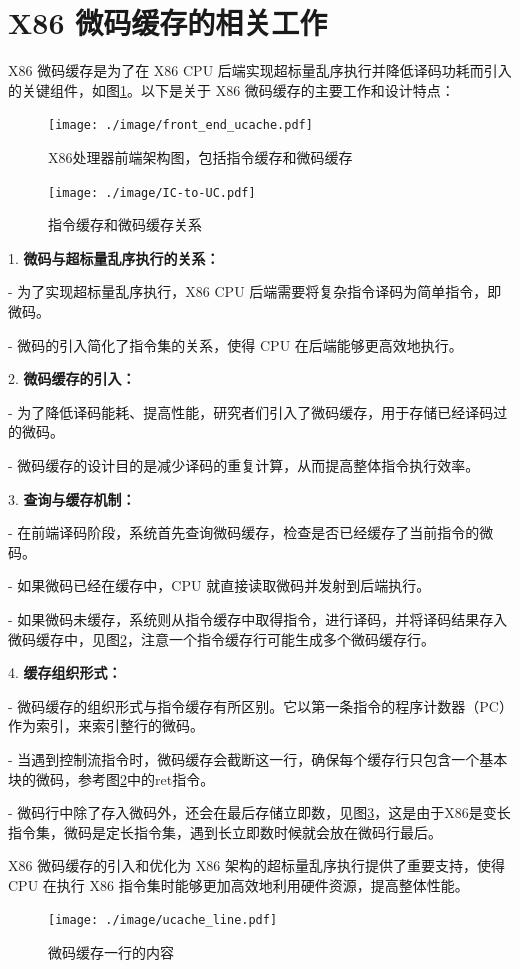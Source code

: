 \section{X86 微码缓存的相关工作}

X86 微码缓存是为了在 X86 CPU 后端实现超标量乱序执行并降低译码功耗而引入的关键组件\cite{solomonMicrooperationCachePower2001}，如图\ref{img:front_end_ucache}。以下是关于 X86 微码缓存的主要工作和设计特点：

\begin{figure}[h]
  \centering
  \texttt{[image: ./image/front\_end\_ucache.pdf]}
  \caption{X86处理器前端架构图，包括指令缓存和微码缓存}
  \label{img:front_end_ucache}
\end{figure}

\begin{figure}[h]
  \centering
  \texttt{[image: ./image/IC-to-UC.pdf]}
  \caption{指令缓存和微码缓存关系}
  \label{img:IC_to_UC}
\end{figure}

1. \textbf{微码与超标量乱序执行的关系：}

   - 为了实现超标量乱序执行，X86 CPU 后端需要将复杂指令译码为简单指令，即微码。

   - 微码的引入简化了指令集的关系，使得 CPU 在后端能够更高效地执行。

2. \textbf{微码缓存的引入：}

- 为了降低译码能耗、提高性能，研究者们引入了微码缓存，用于存储已经译码过的微码。

- 微码缓存的设计目的是减少译码的重复计算，从而提高整体指令执行效率。

3. \textbf{查询与缓存机制：}
  
- 在前端译码阶段，系统首先查询微码缓存，检查是否已经缓存了当前指令的微码。

- 如果微码已经在缓存中，CPU 就直接读取微码并发射到后端执行。

- 如果微码未缓存，系统则从指令缓存中取得指令，进行译码，并将译码结果存入微码缓存中，见图\ref{img:IC_to_UC}，注意一个指令缓存行可能生成多个微码缓存行。

4. \textbf{缓存组织形式：}

- 微码缓存的组织形式与指令缓存有所区别。它以第一条指令的程序计数器（PC）作为索引，来索引整行的微码。

- 当遇到控制流指令时，微码缓存会截断这一行，确保每个缓存行只包含一个基本块的微码，参考图\ref{img:IC_to_UC}中的ret指令。

- 微码行中除了存入微码外，还会在最后存储立即数，见图\ref{img:ucache_line}，这是由于X86是变长指令集，微码是定长指令集，遇到长立即数时候就会放在微码行最后。

X86 微码缓存的引入和优化为 X86 架构的超标量乱序执行提供了重要支持，使得 CPU 在执行 X86 指令集时能够更加高效地利用硬件资源，提高整体性能。

\begin{figure}[h]
  \centering
  \texttt{[image: ./image/ucache\_line.pdf]}
  \caption{微码缓存一行的内容}
  \label{img:ucache_line}
\end{figure}
